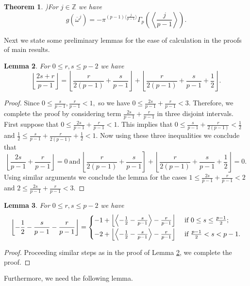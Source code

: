 \documentclass[12pt]{amsart}
\theoremstyle{plain}
\newtheorem{theorem}{Theorem}[section]
\newtheorem{lemma}[theorem]{Lemma}
\theoremstyle{definition}
\theoremstyle{remark}
\numberwithin{equation}{section}
\begin{document}
\begin{theorem} \cite[Gross-Koblitz formula]{gross})\label{gross-koblitz}
    For $j\in \mathbb{Z}$ we have $$g(\overline{\omega}^j)=-\pi^{(p-1)\langle\frac{j}{p-1}\rangle}\Gamma_p\left(\left\langle\frac{j}{p-1}\right\rangle\right).$$
\end{theorem}

Next we state some preliminary lemmas for the ease of calculation in the proofs of main results. 

\begin{lemma}\label{exponent-1}
For $0\leq r,s\leq p-2 $ we have 
$$\left\lfloor\frac{2s+r}{p-1}\right\rfloor=\left\lfloor\frac{r}{2(p-1)}+\frac{s}{p-1}\right\rfloor+\left\lfloor\frac{r}{2(p-1)}+\frac{s}{p-1}+\frac{1}{2}\right\rfloor.$$ 
 \end{lemma}
\begin{proof}
Since $0\leq\frac{s}{p-1}, \frac{r}{p-1}<1,$ so we have  $0\leq\frac{2s}{p-1}+\frac{r}{p-1}<3.$ Therefore, we complete the proof by considering term $\frac{2s}{p-1}+\frac{r}{p-1}$ in three disjoint intervals. First suppose that 
  $0\leq\frac{2s}{p-1}+\frac{r}{p-1}<1. $ This implies that $0\leq\frac{s}{p-1}+\frac{r}{2(p-1)}<\frac{1}{2}$ and $\frac{1}{2}\leq\frac{s}{p-1}+\frac{r}{2(p-1)}+\frac{1}{2}<1.$ Now using these three inequalities we conclude that  
 $$ \left\lfloor\frac{2s}{p-1}+\frac{r}{p-1}\right\rfloor=0\ \text{and}\ \left\lfloor\frac{r}{2(p-1)}+\frac{s}{p-1}\right]+\left\lfloor\frac{r}{2(p-1)}+\frac{s}{p-1}+\frac{1}{2}\right\rfloor=0.$$ 
  Using similar arguments we conclude the lemma for the cases $1\leq\frac{2s}{p-1}+ \frac{r}{p-1}<2$ and $2\leq\frac{2s}{p-1}+ \frac{r}{p-1}<3.$
\end{proof}
\begin{lemma}\label{exponent-2}
For $0\leq r,s \leq p-2$ we have 
 $$\left\lfloor-\frac{1}{2}-\frac{s}{p-1}-\frac{r}{p-1}\right\rfloor=\begin{cases}
    -1+\left\lfloor\left\langle-\frac{1}{2}-\frac{s}{p-1}\right\rangle-\frac{r}{p-1}\right\rfloor &  \ \text{if}\  0\leq s\leq \frac{p-1}{2}; \vspace{.1 cm}\\  
     -2+\left\lfloor\left\langle-\frac{1}{2}-\frac{s}{p-1}\right\rangle-\frac{r}{p-1}\right\rfloor & \ \text{if} \ \frac{p-1}{2}<s<p-1.
\end{cases}$$
\end{lemma}

\begin{proof}
Proceeding similar steps as in the proof of Lemma \ref{exponent-1}, we complete the proof.
\end{proof}
Furthermore, we need the following lemma.
\end{document}
